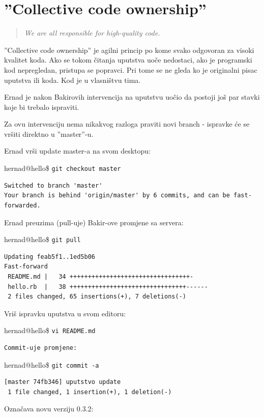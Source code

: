 \documentclass[times, utf8, seminar]{fit}
\begin{document}
\section{''Collective code ownership''}

\begin{quotation}
  \emph{We are all responsible for high-quality code.}
\end{quotation}

''Collective code ownership''\citep[str. ]{agileart} je agilni princip po kome svako odgovoran za visoki kvalitet koda.
Ako se tokom čitanja uputstva uoče nedostaci, ako je programski kod nepregledan, pristupa se popravci.
Pri tome se ne gleda ko je originalni pisac uputstva ili koda. Kod je u vlasništvu tima.

Ernad je nakon Bakirovih intervencija na uputstvu uočio da postoji još par stavki koje bi trebalo ispraviti.

Za ovu intervenciju nema nikakvog razloga praviti novi branch - ispravke će se vršiti direktno u ''master''-u.

Ernad vrši update master-a na svom desktopu:

hernad@hello\ruby\$ \texttt{git checkout master}
\begin{lstlisting}
Switched to branch 'master'
Your branch is behind 'origin/master' by 6 commits, and can be fast-forwarded.
\end{lstlisting}

Ernad preuzima (pull-uje) Bakir-ove promjene sa servera:

hernad@hello\ruby\$ \texttt{git pull}
\begin{lstlisting}
Updating feab5f1..1ed5b06
Fast-forward
 README.md |   34 +++++++++++++++++++++++++++++++++-
 hello.rb  |   38 ++++++++++++++++++++++++++++++++------
 2 files changed, 65 insertions(+), 7 deletions(-)
\end{lstlisting}

Vriš ispravku uputstva u svom editoru:

hernad@hello\ruby\$ \texttt{vi README.md}
\begin{lstlisting}
Commit-uje promjene:
\end{lstlisting}

hernad@hello\ruby\$ \texttt{git commit -a}
\begin{lstlisting}
[master 74fb346] uputstvo update
 1 file changed, 1 insertion(+), 1 deletion(-)
\end{lstlisting}

Označava novu verziju 0.3.2:
\end{document}
